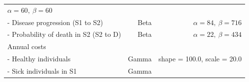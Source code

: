 \documentclass[
]{article}
\begin{document}
\begin{longtable}[]{@{}lrr@{}}
\begin{minipage}[t]{0.42\columnwidth}
\(\alpha=60, \ \beta=60\)\strut
\end{minipage}\tabularnewline
\begin{minipage}[t]{0.32\columnwidth}\raggedright
- Disease progression (S1 to S2)\strut
\end{minipage} & \begin{minipage}[t]{0.17\columnwidth}\raggedleft
Beta\strut
\end{minipage} & \begin{minipage}[t]{0.42\columnwidth}\raggedleft
\(\alpha=84, \ \beta=716\)\strut
\end{minipage}\tabularnewline
\begin{minipage}[t]{0.32\columnwidth}\raggedright
- Probability of death in S2 (S2 to D)\strut
\end{minipage} & \begin{minipage}[t]{0.17\columnwidth}\raggedleft
Beta\strut
\end{minipage} & \begin{minipage}[t]{0.42\columnwidth}\raggedleft
\(\alpha=22, \ \beta=434\)\strut
\end{minipage}\tabularnewline
\begin{minipage}[t]{0.32\columnwidth}\raggedright
Annual costs\strut
\end{minipage} & \begin{minipage}[t]{0.17\columnwidth}\raggedleft
\strut
\end{minipage} & \begin{minipage}[t]{0.42\columnwidth}\raggedleft
\strut
\end{minipage}\tabularnewline
\begin{minipage}[t]{0.32\columnwidth}\raggedright
- Healthy individuals\strut
\end{minipage} & \begin{minipage}[t]{0.17\columnwidth}\raggedleft
Gamma\strut
\end{minipage} & \begin{minipage}[t]{0.42\columnwidth}\raggedleft
shape = 100.0, scale = 20.0\strut
\end{minipage}\tabularnewline
\begin{minipage}[t]{0.32\columnwidth}\raggedright
- Sick individuals in S1\strut
\end{minipage} & \begin{minipage}[t]{0.17\columnwidth}\raggedleft
Gamma\strut
\end{minipage} & \begin{minipage}[t]{0.42\columnwidth}\raggedleft

\end{minipage}
\end{longtable}
\end{document}
